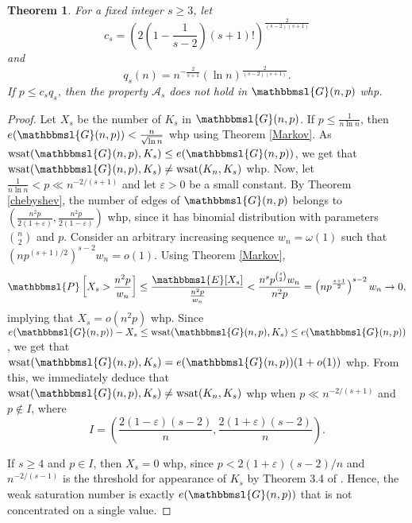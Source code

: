 \documentclass[hidelinks, 11pt]{article}
\theoremstyle{plain}
\newtheorem{theorem}{Theorem}[section]
\theoremstyle{definition}
\begin{document}
\begin{theorem}\label{lower-ii}
For a  fixed integer  $s\geq 3$,  let
$$c_s=\left(2\left(1-\frac{1}{s-2}\right)(s+1)!\right)^{\frac{2}{(s-2)(s+1)}}$$  and $$q_s(n)=n^{-\frac2{s+1}}(\ln n)^\frac{2}{(s-2)(s+1)}.$$
If $p\leq c_sq_s$, then   the property   $\mathcal{A}_s$ does not hold in $\mathbbmsl{G}(n, p)$ whp.
\end{theorem}



\begin{proof}
Let $X_s$ be the number of $K_s$  in $\mathbbmsl{G}(n,p)$.
If $p\leq\frac{1}{n\ln n}$, then    $e(\mathbbmsl{G}(n, p))<\frac{n}{\sqrt{\ln n}}$  whp  using  Theorem \ref{Markov}.  As  $\mathrm{wsat}(\mathbbmsl{G}(n, p), K_s)\leq e(\mathbbmsl{G}(n, p))$, we get that $\mathrm{wsat}(\mathbbmsl{G}(n, p), K_s)\neq\mathrm{wsat}(K_n, K_s)$ whp.
Now, let $\frac{1}{n\ln n}<p\ll n^{-2/(s+1)}$ and let $\varepsilon>0$ be a small constant. By Theorem \ref{chebyshev}, the number of edges of $\mathbbmsl{G}(n,p)$ belongs to $\left(\tfrac{n^2p}{2(1+\varepsilon)}, \frac{n^2p}{2(1-\varepsilon)}\right)$  whp,   since it has binomial distribution with parameters ${n\choose 2}$ and $p$. Consider an arbitrary increasing sequence $w_n=\omega(1)$ such that $(np^{(s+1)/2})^{s-2}w_n=o(1)$. Using  Theorem \ref{Markov},
$$\mathbbmsl{P}\left[X_s>\frac{n^2p}{w_n}\right]\leq\frac{\mathbbmsl{E}[X_s]}{\frac{n^2p}{w_n}}<\frac{n^sp^{s\choose 2}w_n}{n^2p}=\left(np^{\frac{s+1}{2}}\right)^{s-2}w_n\to0,$$
implying that $X_s=o(n^2p)$ whp. Since $e(\mathbbmsl{G}(n, p))-X_s\leq\mathrm{wsat}(\mathbbmsl{G}(n, p), K_s)\leq e(\mathbbmsl{G}(n, p))$, we get   that  $\mathrm{wsat}(\mathbbmsl{G}(n, p), K_s)=e(\mathbbmsl{G}(n, p))(1+o(1))$ whp. From this, we immediately deduce that   $\mathrm{wsat}(\mathbbmsl{G}(n, p), K_s)\neq\mathrm{wsat}(K_n, K_s)$ whp when  $p\ll n^{-2/(s+1)}$ and  $p\notin I$, where $$I=\left(\frac{2(1-\varepsilon)(s-2)}{n}, \frac{2(1+\varepsilon)(s-2)}{n}\right).$$


If  $s\geq4$ and $p\in I$, then  $X_s=0$ whp, since $p<2(1+\varepsilon)(s-2)/n$ and $n^{-2/(s-1)}$ is the threshold for appearance of $K_s$   by  Theorem 3.4 of   \cite{RG}. Hence,    the weak saturation number is exactly $e(\mathbbmsl{G}(n, p))$ that is not concentrated on a single value.



\end{proof}
\end{document}
